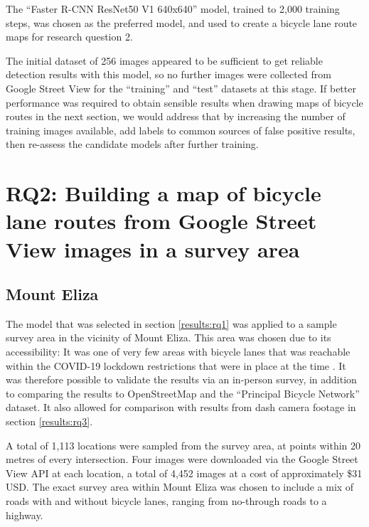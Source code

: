 \documentclass[11pt,twoside]{report}
\begin{document}
The ``Faster R-CNN ResNet50 V1 640x640'' model, trained to 2,000 training steps, was chosen as the preferred model, and used to create a bicycle lane route maps for research question 2.

The initial dataset of 256 images appeared to be sufficient to get reliable detection results with this model, so no further images were collected from Google Street View for the ``training'' and ``test'' datasets at this stage.  If better performance was required to obtain sensible results when drawing maps of bicycle routes in the next section, we would address that by increasing the number of training images available, add labels to common sources of false positive results, then re-assess the candidate models after further training.


\section{RQ2: Building a map of bicycle lane routes from Google Street View images in a survey area}
\label{results:rq2}

\subsection{Mount Eliza}
\label{results:rq2a}

The model that was selected in section \ref{results:rq1} was applied to a sample survey area in the vicinity of Mount Eliza.  This area was chosen due to its accessibility:  It was one of very few areas with bicycle lanes that was reachable within the COVID-19 lockdown restrictions that were in place at the time \cite{lockdown_record} \cite{lockdown_5km}.  It was therefore possible to validate the results via an in-person survey, in addition to comparing the results to OpenStreetMap and the ``Principal Bicycle Network'' dataset.  It also allowed for comparison with results from dash camera footage in section \ref{results:rq3}.

A total of 1,113 locations were sampled from the survey area, at points within 20 metres of every intersection.  Four images were downloaded via the Google Street View API at each location, a total of 4,452 images at a cost of approximately \$31 USD.  The exact survey area within Mount Eliza was chosen to include a mix of roads with and without bicycle lanes, ranging from no-through roads to a highway.
\end{document}
